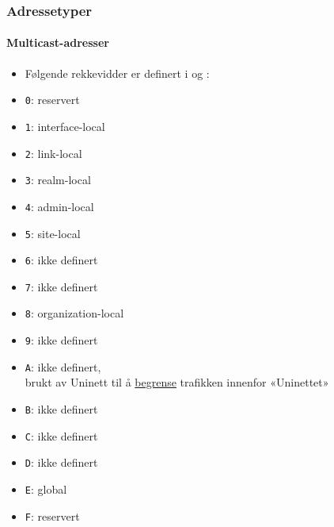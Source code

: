 \begin{frame}[fragile]%
  \frametitle{Adressetyper}
  \framesubtitle{Multicast-adresser}
  \begin{multicols}{2}
    \begin{itemize}%
    \item Følgende rekkevidder er definert i  og :
    \item \texttt{0}: reservert
    \item \texttt{1}: interface-local
    \item \texttt{2}: link-local
    \item \texttt{3}: realm-local
    \item \texttt{4}: admin-local
    \item \texttt{5}: site-local
    \item \texttt{6}: ikke definert
    \item \texttt{7}: ikke definert
    \item \texttt{8}: organization-local
    \item \texttt{9}: ikke definert
    \item \texttt{A}: ikke definert,\\ brukt av Uninett til å
      \href{http://drift.uninett.no/nett/ip-nett/ipv6-multicastadresser.html}{begrense}
      trafikken innenfor «Uninettet»
    \item \texttt{B}: ikke definert
    \item \texttt{C}: ikke definert
    \item \texttt{D}: ikke definert
    \item \texttt{E}: global
    \item \texttt{F}: reservert
    \end{itemize}
  \end{multicols}
\end{frame}

